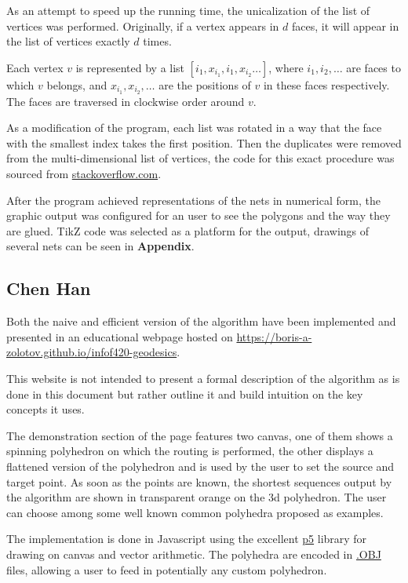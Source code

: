\documentclass[a4paper,11pt]{article}
\begin{document}
As an attempt to speed up the running time, the unicalization of the list of vertices was performed. Originally, if a vertex appears in $d$ faces, it will appear in the list of vertices exactly $d$ times.

Each vertex $v$ is represented by a list $\left[ i_1, x_{i_1}, i_1, x_{i_2} \ldots \right]$, where $i_1, i_2, \ldots$ are faces to which $v$ belongs, and $x_{i_1}, x_{i_2}, \ldots$ are the positions of $v$ in these faces respectively. The faces are traversed in clockwise order around $v$.

As a modification of the program, each list was rotated in a way that the face with the smallest index takes the first position. Then the duplicates were removed from the multi-dimensional list of vertices, the code for this exact procedure was sourced from \url{stackoverflow.com}.

After the program achieved representations of the nets in numerical form, the graphic output was configured for an user to see the polygons and the way they are glued. TikZ code was selected as a platform for the output, drawings of several nets can be seen in {\bf Appendix}.

\subsection{Chen Han}

Both the naive and efficient version of the algorithm have been implemented and presented in an educational webpage hosted on \url{https://boris-a-zolotov.github.io/infof420-geodesics}.

This website is not intended to present a formal description of the algorithm as is done in this document but rather outline it and build intuition on the key concepts it uses.

The demonstration section of the page features two canvas, one of them shows a spinning polyhedron on which the routing is performed, the other displays a flattened version of the polyhedron and is used by the user to set the source and target point. As soon as the points are known, the shortest sequences output by the algorithm are shown in transparent orange on the 3d polyhedron. The user can choose among some well known common polyhedra proposed as examples.

The implementation is done in Javascript using the excellent \href{https://p5js.org/reference/}{p5} library for drawing on canvas and vector arithmetic. The polyhedra are encoded in \href{https://docs.fileformat.com/3d/obj/}{.OBJ} files, allowing a user to feed in potentially any custom polyhedron.
\end{document}
